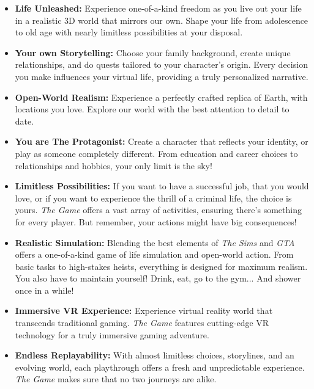 \documentclass[a4paper,10pt,english]{article}
\begin{document}
\begin{itemize}
\item \textbf{Life Unleashed:} Experience one-of-a-kind freedom as you live out your life in a realistic 3D world that mirrors our own. Shape your life from adolescence to old age with nearly limitless possibilities at your disposal.

\item \textbf{Your own Storytelling:} Choose your family background, create unique relationships, and do quests tailored to your character's origin. Every decision you make influences your virtual life, providing a truly personalized narrative.

\item \textbf{Open-World Realism:} Experience a perfectly crafted replica of Earth, with locations you love. Explore our world with the best attention to detail to date.

\item \textbf{You are The Protagonist:} Create a character that reflects your identity, or play as someone completely different. From education and career choices to relationships and hobbies, your only limit is the sky!

\item \textbf{Limitless Possibilities:} If you want to have a successful job, that you would love, or if you want to experience the thrill of a criminal life, the choice is yours. \emph{The Game} offers a vast array of activities, ensuring there's something for every player. But remember, your actions might have big consequences! 

\item \textbf{Realistic Simulation:} Blending the best elements of \emph{The Sims} and \emph{GTA} offers a one-of-a-kind game of life simulation and open-world action. From basic tasks to high-stakes heists, everything is designed for maximum realism. You also have to maintain yourself! Drink, eat, go to the gym... And shower once in a while!

\item \textbf{Immersive VR Experience:} Experience virtual reality world that transcends traditional gaming. \emph{The Game} features cutting-edge VR technology for a truly immersive gaming adventure.

\item \textbf{Endless Replayability:} With almost limitless choices, storylines, and an evolving world, each playthrough offers a fresh and unpredictable experience. \emph{The Game} makes sure that no two journeys are alike.
\end{itemize}
\end{document}
